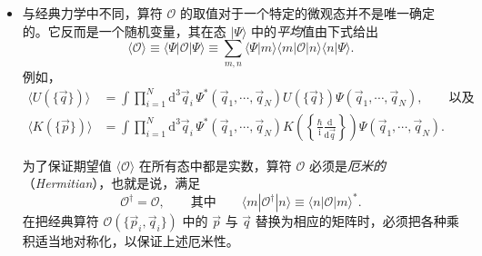 \begin{itemize}[leftmargin=1.6em,itemsep=0.4em]

（注意经典的 Poisson 括号满足 $\{p_j,q_k\}=-\delta_{j,k}$。相当一般地，量子对易关系通过把相应的经典 Poisson 括号乘以 $\mathrm i\hbar$ 得到。）

\item 与经典力学中不同，算符 $\mathcal O$ 的取值对于一个特定的微观态并不是唯一确定的。它反而是一个随机变量，其在态 $|\Psi\rangle$ 中的\emph{平均}值由下式给出
\begin{equation}\label{eq:6.67}
\langle\mathcal O\rangle\equiv\langle\Psi|\mathcal O|\Psi\rangle\equiv\sum_{m,n}\langle\Psi|m\rangle\langle m|\mathcal O|n\rangle\langle n|\Psi\rangle.
\end{equation}
例如，
\begin{equation*}
\begin{aligned}
\langle U(\{\vec q\})\rangle&=\int\prod_{i=1}^N\mathrm d^3\vec q_i\,\Psi^*(\vec q_1,\cdots,\vec q_N)U(\{\vec q\})\Psi(\vec q_1,\cdots,\vec q_N),\qquad\text{以及}\\
\langle K(\{\vec p\})\rangle&=\int\prod_{i=1}^N\mathrm d^3\vec q_i\,\Psi^*(\vec q_1,\cdots,\vec q_N)K\left(\left\{\frac\hbar{\mathrm i}\frac{\mathrm d}{\mathrm d\vec q}\right\}\right)\Psi(\vec q_1,\cdots,\vec q_N).
\end{aligned}
\end{equation*}

为了保证期望值 $\langle\mathcal O\rangle$ 在所有态中都是实数，算符 $\mathcal O$ 必须是\emph{厄米的}（\textit{Hermitian}），也就是说，满足
\begin{equation}\label{eq:6.68}
\mathcal O^\dagger=\mathcal O,\qquad\text{其中}\qquad\langle m|\mathcal O^\dagger|n\rangle\equiv\langle n|\mathcal O|m\rangle^*.
\end{equation}
在把经典算符 $\mathcal O(\{\vec p_i,\vec q_i\})$ 中的 $\vec p$ 与 $\vec q$ 替换为相应的矩阵时，必须把各种乘积适当地对称化，以保证上述厄米性。


\end{itemize}
